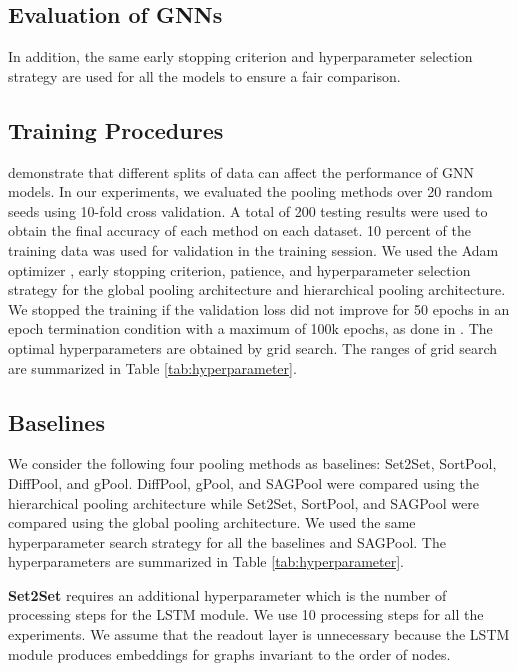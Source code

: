 \documentclass{article}
\begin{document}
\subsection{Evaluation of GNNs}  In addition, the same early stopping criterion and hyperparameter selection strategy are used for all the models to ensure a fair comparison.


\subsection{Training Procedures}
\label{ex:train}
\citeauthor{DBLP:journals/corr/abs-1811-05868} demonstrate that different splits of data can affect the performance of GNN models. In our experiments, we evaluated the pooling methods over 20 random seeds using 10-fold cross validation. A total of 200 testing results were used to obtain the final accuracy of each method on each dataset. 10 percent of the training data was used for validation in the training session. We used the Adam optimizer \cite{DBLP:journals/corr/KingmaB14}, early stopping criterion, patience, and hyperparameter selection strategy for the global pooling architecture and hierarchical pooling architecture. We stopped the training if the validation loss did not improve for 50 epochs in an epoch termination condition with a maximum of 100k epochs, as done in \cite{DBLP:journals/corr/abs-1811-05868}. The optimal hyperparameters are obtained by grid search. The ranges of grid search are summarized in Table \ref{tab:hyperparameter}.

\subsection{Baselines}
\label{ex:baseline}
We consider the following four pooling methods as baselines: Set2Set, SortPool, DiffPool, and gPool. DiffPool, gPool, and SAGPool were compared using the hierarchical pooling architecture while Set2Set, SortPool, and SAGPool were compared using the global pooling architecture. We used the same hyperparameter search strategy for all the baselines and SAGPool. The hyperparameters are summarized in Table \ref{tab:hyperparameter}.

\textbf{Set2Set} \cite{SET2SET} requires an additional hyperparameter which is the number of processing steps for the LSTM\cite{lstm} module. We use 10 processing steps for all the experiments. We assume that the readout layer is unnecessary because the LSTM module produces embeddings for graphs invariant to the order of nodes.
\end{document}
